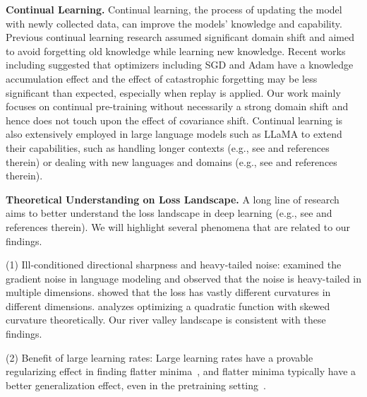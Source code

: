 \textbf{Continual Learning.}  Continual learning, the process of updating the model with newly collected data, can improve the models' knowledge and capability.  Previous continual learning research \citep{aljundi2019online, veniat2021efficient, cossu2022continual, 51163, harun2023siesta, mehta2023empirical} assumed  significant domain shift and aimed to avoid forgetting old knowledge while learning new knowledge. 
Recent works including \citet{hernandez2021scaling, lesort2023challenging} suggested that optimizers including SGD and Adam have a knowledge accumulation effect and the effect of catastrophic forgetting may be less significant than expected, especially when replay is applied. Our work mainly focuses on continual pre-training without necessarily a strong domain shift and hence does not touch upon the effect of covariance shift. Continual learning is also extensively employed in large language models such as LLaMA to extend their capabilities, such as handling longer contexts (e.g., see \citet{tworkowski2023focused, peng2023yarnefficientcontextwindow, chen2023extendingcontextwindowlarge, dubey2024llama3herdmodels} and references therein) or dealing with new languages and domains (e.g., see \citet{azerbayev2024llemmaopenlanguagemodel, rozière2024codellamaopenfoundation, cui2024efficienteffectivetextencoding} and references therein).



\textbf{Theoretical Understanding on Loss Landscape.} A long line of research aims to better understand the loss landscape in deep learning (e.g., see \citet{freeman2017topologygeometryhalfrectifiednetwork, garipov2018losssurfacesmodeconnectivity, li2020explaining} and references therein). We will highlight several phenomena that are related to our findings. 

(1) Ill-conditioned directional sharpness and heavy-tailed noise: \citet{zhang2020gradient, NEURIPS2020_b05b57f6} examined the gradient noise in language modeling and observed that the noise is heavy-tailed in multiple dimensions. \citet{pan2023understanding, liu2024sophia} showed that the loss has vastly different curvatures in different dimensions. \citet{pan2022eigencurveoptimallearningrate} analyzes optimizing a quadratic function with skewed curvature theoretically.
Our river valley landscape is consistent with these findings. 

(2) Benefit of large learning rates: Large learning rates have a provable regularizing effect in finding flatter minima~\citep{kong2020stochasticity, wang2022large}, and flatter minima typically have a better generalization effect, even in the pretraining setting~\citep{jiang2019fantastic, blanc2020implicit, liu2022pretraining, li2022happens, ma2022quadratic, lyu2023understanding, andriushchenko2023sgdlargestepsizes}. 

